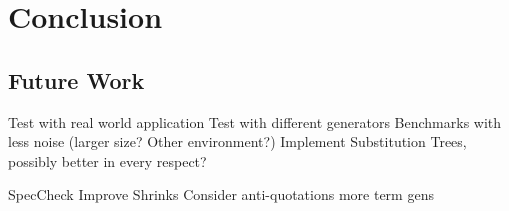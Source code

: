 \chapter{Conclusion}

\section{Future Work}
Test with real world application
Test with different generators
Benchmarks with less noise (larger size? Other environment?)
Implement Substitution Trees, possibly better in every respect?

SpecCheck
Improve Shrinks
Consider anti-quotations
more term gens
